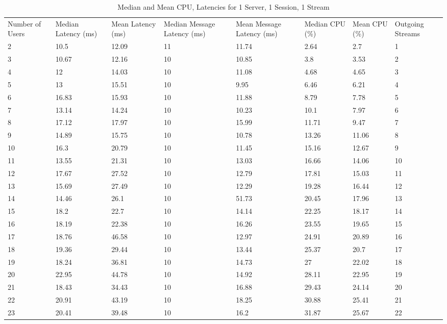 \begin{table}
\caption{Median and Mean CPU, Latencies for 1 Server, 1 Session, 1 Stream}
\label{table:1serv_1sess_1str}
\begin{tabu} to\linewidth{|X[c]|X[c]|X[c]|X[c]|X[c]|X[c]|X[c]|X[c]|}
\everyrow{\hline}
\hline
Number of Users & Median Latency (ms) & Mean Latency (ms) & Median Message Latency (ms) & Mean Message Latency (ms) & Median CPU (\%) & Mean CPU (\%) & Outgoing Streams\\
2 & 10.5 & 12.09 & 11 & 11.74 & 2.64 & 2.7 & 1 \\
3 & 10.67 & 12.16 & 10 & 10.85 & 3.8 & 3.53 & 2 \\
4 & 12 & 14.03 & 10 & 11.08 & 4.68 & 4.65 & 3 \\
5 & 13 & 15.51 & 10 & 9.95 & 6.46 & 6.21 & 4 \\
6 & 16.83 & 15.93 & 10 & 11.88 & 8.79 & 7.78 & 5 \\
7 & 13.14 & 14.24 & 10 & 10.23 & 10.1 & 7.97 & 6 \\
8 & 17.12 & 17.97 & 10 & 15.99 & 11.71 & 9.47 & 7 \\
9 & 14.89 & 15.75 & 10 & 10.78 & 13.26 & 11.06 & 8 \\
10 & 16.3 & 20.79 & 10 & 11.45 & 15.16 & 12.67 & 9 \\
11 & 13.55 & 21.31 & 10 & 13.03 & 16.66 & 14.06 & 10 \\
12 & 17.67 & 27.52 & 10 & 12.79 & 17.81 & 15.03 & 11 \\
13 & 15.69 & 27.49 & 10 & 12.29 & 19.28 & 16.44 & 12 \\
14 & 14.46 & 26.1 & 10 & 51.73 & 20.45 & 17.96 & 13 \\
15 & 18.2 & 22.7 & 10 & 14.14 & 22.25 & 18.17 & 14 \\
16 & 18.19 & 22.38 & 10 & 16.26 & 23.55 & 19.65 & 15 \\
17 & 18.76 & 46.58 & 10 & 12.97 & 24.91 & 20.89 & 16 \\
18 & 19.36 & 29.44 & 10 & 13.44 & 25.37 & 20.7 & 17 \\
19 & 18.24 & 36.81 & 10 & 14.73 & 27 & 22.02 & 18 \\
20 & 22.95 & 44.78 & 10 & 14.92 & 28.11 & 22.95 & 19 \\
21 & 18.43 & 34.43 & 10 & 16.88 & 29.43 & 24.14 & 20 \\
22 & 20.91 & 43.19 & 10 & 18.25 & 30.88 & 25.41 & 21 \\
23 & 20.41 & 39.48 & 10 & 16.2 & 31.87 & 25.67 & 22 \\

\end{tabu}
\end{table}
